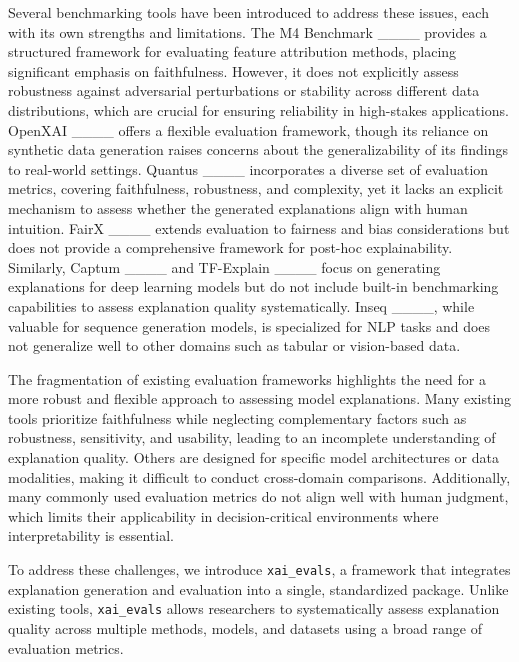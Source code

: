 Several benchmarking tools have been introduced to address these issues, each with its own strengths and limitations. The M4 Benchmark ____ provides a structured framework for evaluating feature attribution methods, placing significant emphasis on faithfulness. However, it does not explicitly assess robustness against adversarial perturbations or stability across different data distributions, which are crucial for ensuring reliability in high-stakes applications. OpenXAI ____ offers a flexible evaluation framework, though its reliance on synthetic data generation raises concerns about the generalizability of its findings to real-world settings. Quantus ____ incorporates a diverse set of evaluation metrics, covering faithfulness, robustness, and complexity, yet it lacks an explicit mechanism to assess whether the generated explanations align with human intuition. FairX ____ extends evaluation to fairness and bias considerations but does not provide a comprehensive framework for post-hoc explainability. Similarly, Captum ____ and TF-Explain ____ focus on generating explanations for deep learning models but do not include built-in benchmarking capabilities to assess explanation quality systematically. Inseq ____, while valuable for sequence generation models, is specialized for NLP tasks and does not generalize well to other domains such as tabular or vision-based data.  

The fragmentation of existing evaluation frameworks highlights the need for a more robust and flexible approach to assessing model explanations. Many existing tools prioritize faithfulness while neglecting complementary factors such as robustness, sensitivity, and usability, leading to an incomplete understanding of explanation quality. Others are designed for specific model architectures or data modalities, making it difficult to conduct cross-domain comparisons. Additionally, many commonly used evaluation metrics do not align well with human judgment, which limits their applicability in decision-critical environments where interpretability is essential.  

To address these challenges, we introduce \texttt{xai\_evals}, a framework that integrates explanation generation and evaluation into a single, standardized package. Unlike existing tools, \texttt{xai\_evals} allows researchers to systematically assess explanation quality across multiple methods, models, and datasets using a broad range of evaluation metrics.